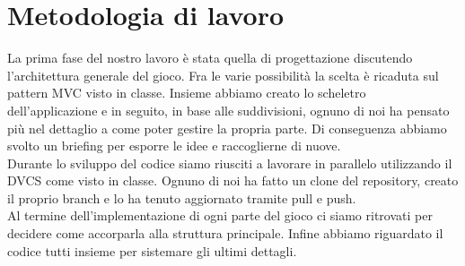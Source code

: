 \documentclass[a4paper,12pt]{report}
\begin{document}
\section{Metodologia di lavoro}
La prima fase del nostro lavoro è stata quella di progettazione discutendo l'architettura generale del gioco. Fra le varie possibilità la scelta è ricaduta sul pattern MVC visto in classe.
Insieme abbiamo creato lo scheletro dell'applicazione e in seguito, in base alle suddivisioni, ognuno di noi ha pensato più nel dettaglio a come poter gestire la propria parte. Di conseguenza abbiamo svolto un briefing per esporre le idee e raccoglierne di nuove.\\
Durante lo sviluppo del codice siamo riusciti a lavorare in parallelo utilizzando il DVCS come visto in classe. Ognuno di noi ha fatto un clone del repository, creato il proprio branch e lo ha tenuto aggiornato tramite pull e push.\\
Al termine dell’implementazione di ogni parte del gioco ci siamo ritrovati per decidere come accorparla alla struttura principale. Infine abbiamo riguardato il codice tutti insieme per sistemare gli ultimi dettagli.
%
\\ \\ 
\end{document}
